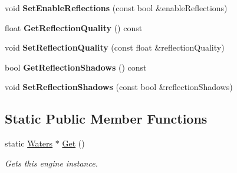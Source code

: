 \begin{DoxyCompactItemize}
\item 
\mbox{\label{class_flounder_1_1_waters_a101d6dd96d33eec8f7bc98786947e80f}} 
void {\bfseries Set\+Enable\+Reflections} (const bool \&enable\+Reflections)
\item 
\mbox{\label{class_flounder_1_1_waters_a5f3a990254466be2c03437e8b82befe7}} 
float {\bfseries Get\+Reflection\+Quality} () const
\item 
\mbox{\label{class_flounder_1_1_waters_a75d6d7a19d7c58321f2f8122959d2264}} 
void {\bfseries Set\+Reflection\+Quality} (const float \&reflection\+Quality)
\item 
\mbox{\label{class_flounder_1_1_waters_a2d468a429743c6c2ac33b4e8f8429a81}} 
bool {\bfseries Get\+Reflection\+Shadows} () const
\item 
\mbox{\label{class_flounder_1_1_waters_a44466eaabf74f82f7ed9973950cb5f50}} 
void {\bfseries Set\+Reflection\+Shadows} (const bool \&reflection\+Shadows)
\end{DoxyCompactItemize}
\subsection*{Static Public Member Functions}
\begin{DoxyCompactItemize}
\item 
static \hyperlink{class_flounder_1_1_waters}{Waters} $\ast$ \hyperlink{class_flounder_1_1_waters_af64e7fa0cd05d74e9d9309c3c46e2e65}{Get} ()
\begin{DoxyCompactList}\small\item\em Gets this engine instance. \end{DoxyCompactList}\end{DoxyCompactItemize}
